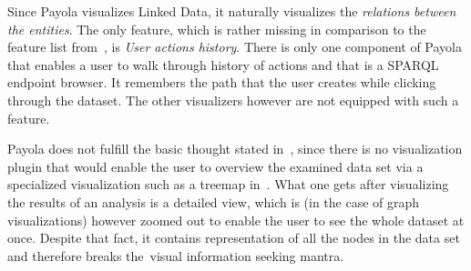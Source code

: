 Since Payola visualizes Linked Data, it naturally visualizes the \emph{relations between the entities}.
The only feature, which is rather missing in comparison to the feature list from~\cite{mantra}, is
\emph{User actions history}.
There is only one component of Payola that enables a user to walk through 
history of actions and that is a SPARQL endpoint browser. It remembers the path 
that the user creates while clicking through the dataset. The other visualizers 
however are not equipped with such a feature.

Payola does not fulfill the basic thought stated in~\cite{mantra}, since 
there is no visualization plugin that would enable the user to overview the 
examined data set via a specialized visualization such as a treemap 
in~\cite{lodvis}. What one gets after visualizing the results of an analysis is a 
detailed view, which is (in the case of graph visualizations) however zoomed out
to enable the user to see the whole dataset at once. Despite that fact, it 
contains representation of all the nodes in the data set and therefore breaks 
the~visual information seeking mantra.

